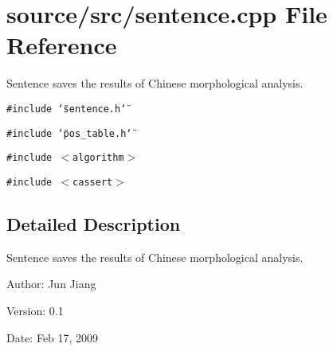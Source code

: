 \section{source/src/sentence.cpp File Reference}
\label{sentence_8cpp}
Sentence saves the results of Chinese morphological analysis.  


{\tt \#include \char`\"{}sentence.h\char`\"{}}\par
{\tt \#include \char`\"{}pos\_\-table.h\char`\"{}}\par
{\tt \#include $<$algorithm$>$}\par
{\tt \#include $<$cassert$>$}\par


\subsection{Detailed Description}
Sentence saves the results of Chinese morphological analysis. 

\begin{Desc}
\item[Author:]Jun Jiang \end{Desc}
\begin{Desc}
\item[Version:]0.1 \end{Desc}
\begin{Desc}
\item[Date:]Feb 17, 2009 \end{Desc}
